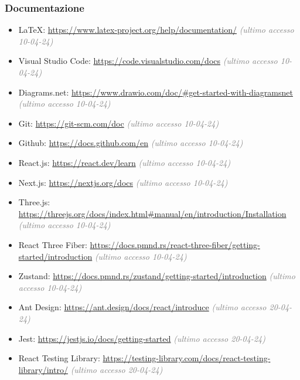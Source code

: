 \subsubsection{Documentazione}
\begin{itemize}
        \item \LaTeX: \url{https://www.latex-project.org/help/documentation/} \textcolor{gray}{\textit{(ultimo accesso 10-04-24)}}
        \item Visual Studio Code: \url{https://code.visualstudio.com/docs} \textcolor{gray}{\textit{(ultimo accesso 10-04-24)}}
        \item Diagrams.net: \url{https://www.drawio.com/doc/#get-started-with-diagramsnet} \textcolor{gray}{\textit{(ultimo accesso 10-04-24)}}
        \item Git: \url{https://git-scm.com/doc} \textcolor{gray}{\textit{(ultimo accesso 10-04-24)}}
        \item Github: \url{https://docs.github.com/en} \textcolor{gray}{\textit{(ultimo accesso 10-04-24)}}
        \item React.js: \url{https://react.dev/learn} \textcolor{gray}{\textit{(ultimo accesso 10-04-24)}}
        \item Next.js: \url{https://nextjs.org/docs} \textcolor{gray}{\textit{(ultimo accesso 10-04-24)}}
        \item Three.js: \url{https://threejs.org/docs/index.html#manual/en/introduction/Installation} \textcolor{gray}{\textit{(ultimo accesso 10-04-24)}}
        \item React Three Fiber: \url{https://docs.pmnd.rs/react-three-fiber/getting-started/introduction} \textcolor{gray}{\textit{(ultimo accesso 10-04-24)}}
        \item Zustand: \url{https://docs.pmnd.rs/zustand/getting-started/introduction} \textcolor{gray}{\textit{(ultimo accesso 10-04-24)}}
        \item Ant Design: \url{https://ant.design/docs/react/introduce} \textcolor{gray}{\textit{(ultimo accesso 20-04-24)}}
        \item Jest: \url{https://jestjs.io/docs/getting-started} \textcolor{gray}{\textit{(ultimo accesso 20-04-24)}}
        \item React Testing Library: \url{https://testing-library.com/docs/react-testing-library/intro/} \textcolor{gray}{\textit{(ultimo accesso 20-04-24)}}
    \end{itemize}
